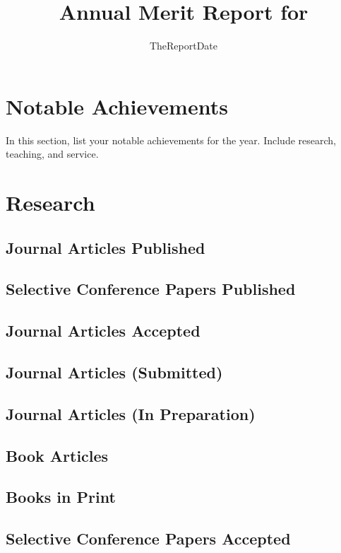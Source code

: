 \documentclass[12pt]{article}
\date{TheReportDate}
\title{Annual Merit Report for \reportyear}
\author{\name}
\begin{document}
\maketitle 

\section{Notable Achievements}

In this section, list your notable achievements for the year.  Include
research, teaching, and service.

\section{Research}

\subsection{Journal Articles Published}

\subsection{Selective Conference Papers Published}

\subsection{Journal Articles Accepted}

\subsection{Journal Articles (Submitted)}

\subsection{Journal Articles (In Preparation)}

\subsection{Book Articles}

\subsection{Books in Print}

\subsection{Selective Conference Papers Accepted} 
\end{document}
